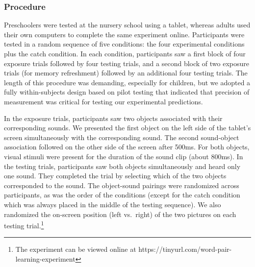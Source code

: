 \documentclass[english,,man,floatsintext]{apa6}
\let\rmarkdownfootnote\footnote%
\def\footnote{\protect\rmarkdownfootnote}
\theoremstyle{definition}
\theoremstyle{definition}
\theoremstyle{definition}
\theoremstyle{remark}
\begin{document}
\subsubsection{Procedure}\label{procedure}

Preschoolers were tested at the nursery school using a tablet, whereas
adults used their own computers to complete the same experiment online.
Participants were tested in a random sequence of five conditions: the
four experimental conditions plus the catch condition. In each
condition, participants saw a first block of four exposure trials
followed by four testing trials, and a second block of two exposure
trials (for memory refreshment) followed by an additional four testing
trials. The length of this procedure was demanding, especially for
children, but we adopted a fully within-subjects design based on pilot
testing that indicated that precision of measurement was critical for
testing our experimental predictions.

In the exposure trials, participants saw two objects associated with
their corresponding sounds. We presented the first object on the left
side of the tablet's screen simultaneously with the corresponding sound.
The second sound-object association followed on the other side of the
screen after 500ms. For both objects, visual stimuli were present for
the duration of the sound clip (about 800ms). In the testing trials,
participants saw both objects simultaneously and heard only one sound.
They completed the trial by selecting which of the two objects
corresponded to the sound. The object-sound pairings were randomized
across participants, as was the order of the conditions (except for the
catch condition which was always placed in the middle of the testing
sequence). We also randomized the on-screen position (left vs.~right) of
the two pictures on each testing
trial.\footnote{The experiment can be viewed online at https://tinyurl.com/word-pair-learning-experiment}
\end{document}
